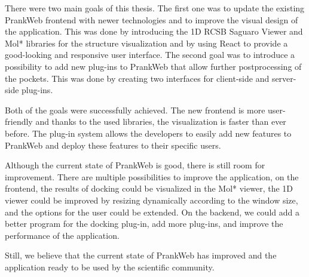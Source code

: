 
\label{chap:conclusion}

There were two main goals of this thesis. The first one was to update the existing PrankWeb frontend with newer technologies and to improve the visual design of the application. This was done by introducing the 1D RCSB Saguaro Viewer and Mol* libraries for the structure visualization and by using React to provide a good-looking and responsive user interface. The second goal was to introduce a possibility to add new plug-ins to PrankWeb that allow further postprocessing of the pockets. This was done by creating two interfaces for client-side and server-side plug-ins.

Both of the goals were successfully achieved. The new frontend is more user-friendly and thanks to the used libraries, the visualization is faster than ever before. The plug-in system allows the developers to easily add new features to PrankWeb and deploy these features to their specific users.

Although the current state of PrankWeb is good, there is still room for improvement. There are multiple possibilities to improve the application, on the frontend, the results of docking could be visualized in the Mol* viewer, the 1D viewer could be improved by resizing dynamically according to the window size, and the options for the user could be extended. On the backend, we could add a better program for the docking plug-in, add more plug-ins, and improve the performance of the application.

Still, we believe that the current state of PrankWeb has improved and the application ready to be used by the scientific community.

